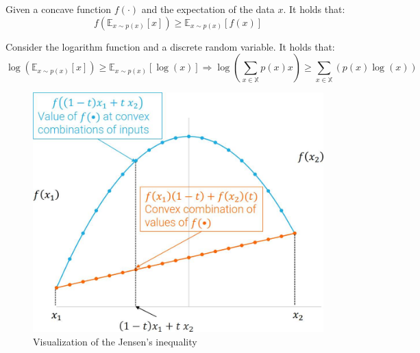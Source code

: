 \begin{description}
\begin{description}
\begin{description}
                        \begin{lemma}
                            Given a concave function $f(\cdot)$ and the expectation of the data $x$. It holds that:
                            \[ f(\mathbb{E}_{x \sim p(x)}[x]) \geq \mathbb{E}_{x \sim p(x)}[f(x)] \]

                            \begin{example}
                                Consider the logarithm function and a discrete random variable. It holds that:
                                \[ \log\left( \mathbb{E}_{x \sim p(x)}[x] \right) \geq \mathbb{E}_{x \sim p(x)}[\log(x)] \Rightarrow \log\left( \sum_{x \in \mathbb{X}} p(x)x \right) \geq \sum_{x \in \mathbb{X}} (p(x)\log(x)) \]
                            \end{example}

                            \begin{figure}[H]
                                \centering
                                \includegraphics[width=0.4\linewidth]{./img/jensen_inequality.jpg}
                                \caption{Visualization of the Jensen's inequality}
                            \end{figure}
                        \end{lemma}


\end{description}
\end{description}
\end{description}
